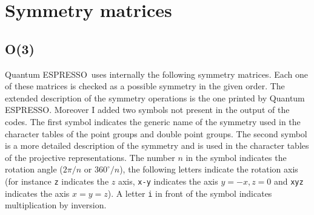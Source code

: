 \documentclass[12pt,a4paper,twoside]{report}
\def\qe{{\sc Quantum ESPRESSO}}
\begin{document}
\newpage
{\color{dark-blue}\chapter{Symmetry matrices}
\label{section_sym}}
{\color{coral}\section{O(3)}}
\color{black}
\qe\ uses internally the following symmetry matrices. Each one of these
matrices is checked as a possible symmetry in the given order. The extended
description of the symmetry operations is the one printed by \qe. Moreover
I added two symbols not present in the output of the codes. The
first symbol indicates the generic name of the symmetry used in the character
tables of the point groups and double point groups. The second symbol is
a more detailed description of the symmetry and is used in the character
tables of the projective representations. The number $n$ in the symbol 
indicates the rotation angle ($2 \pi / n$ or $360^\circ/n$), the following
letters indicate the rotation axis (for instance \texttt{z} indicates the 
$z$ axis, \texttt{x-y} indicates the axis $y=-x, z=0$ and \texttt{xyz} 
indicates the axis $x=y=z$).
A letter \texttt{i} in front of the symbol indicates multiplication 
by inversion.
\end{document}
